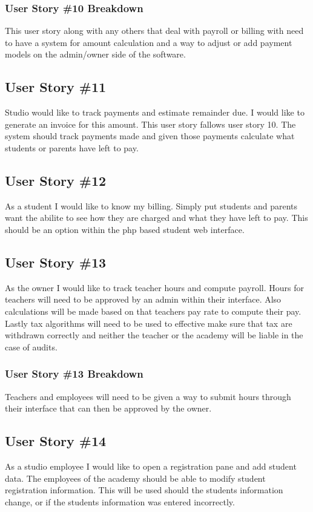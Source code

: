 \subsubsection{User Story \#10 Breakdown}
This user story along with any others that deal with payroll or billing with need to have a system for amount calculation and a way to adjust or add payment models on the admin/owner side of the software.

\subsection{User Story \#11}
Studio would like to track payments and estimate remainder due.  I would like to generate an invoice for this amount. This user story fallows user story 10. The system should track payments made and given those payments calculate what students or parents have left to pay.


\subsection{User Story \#12}
As a student I would like to know my billing. Simply put students and parents want the abilite to see how they are charged and what they have left to pay. This should be an option within the php based student web interface.


\subsection{User Story \#13}
As the owner I would like to track teacher hours and compute payroll. Hours for teachers will need to be approved by an admin within their interface. Also calculations will be made based on that teachers pay rate to compute their pay. Lastly tax algorithms will need to be used to effective make sure that tax are withdrawn correctly and neither the teacher or the academy will be liable in the case of audits.

\subsubsection{User Story \#13 Breakdown}
Teachers and employees will need to be given a way to submit hours through their interface that can then be approved by the owner.

\subsection{User Story \#14}
As a studio employee I would like to open a registration pane and add student data. The employees of the academy should be able to modify student registration information. This will be used should the students information change, or if the students information was entered incorrectly.

